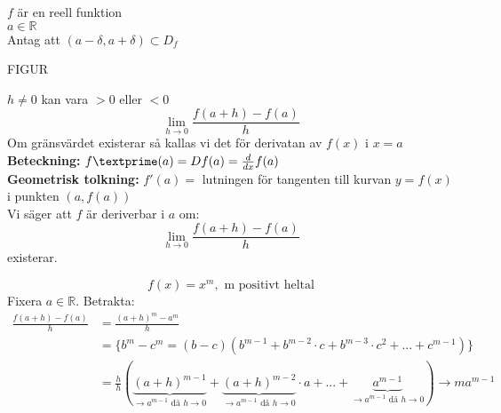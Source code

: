 $f$ är en reell funktion\\
$a \in \mathbb{R}$\\
Antag att $(a - \delta, a + \delta) \subset D_f$
\begin{center}
	FIGUR
\end{center}
$h \neq 0$ kan vara $> 0$ eller $< 0$
\[
\lim\limits_{h \to 0}\frac{f(a+h) - f(a)}{h}
\]
Om gränsvärdet existerar så kallas vi det för derivatan av $f(x)$ i $x=a$\\
\textbf{Beteckning:} $f\textprime(a) = Df(a)=\frac{d}{dx}f(a)$\\
\textbf{Geometrisk tolkning:} $f\prime(a) = $ lutningen för tangenten till kurvan $y=f(x)$ i punkten $(a, f(a))$\\
Vi säger att $f$ är deriverbar i $a$ om:
\[
\lim\limits_{h \to 0}\frac{f(a + h)- f(a)}{h}
\]
existerar.

\begin{Ex}
    \[
    f(x) = x^m, \mbox{ m positivt heltal}
    \]
    Fixera $a \in \mathbb{R}$. Betrakta:
    \begin{align*}
    	\frac{f(a + h) - f(a)}{h} &= \frac{(a + h)^m - a^m}{h} \\
    	&= \{b^m - c^m = (b-c)(b^{m-1} + b^{m-2} \cdot c + b^{m-3}\cdot c^2 + ... + c^{m-1})\}\\
    	&= \frac{h}{h}(\underbrace{(a + h)^{m-1}}_{\to a^{m-1} \mbox{ då } h \to 0} + \underbrace{(a+h)^{m-2}}_{\to a^{m-1} \mbox{ då } h \to 0} \cdot a + ... + \underbrace{a^{m-1}}_{\to a^{m-1} \mbox{ då } h \to 0}) \to ma^{m-1}
    \end{align*}
\end{Ex}



























